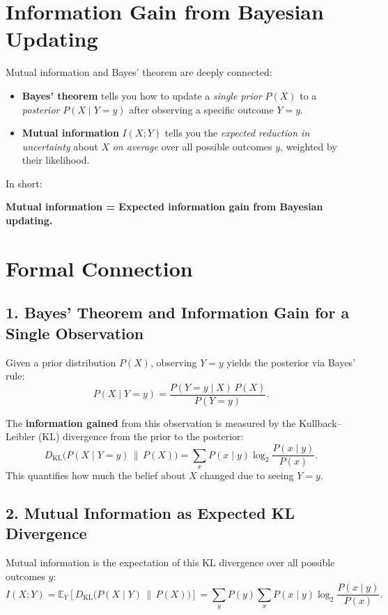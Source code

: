 \documentclass[11pt]{article}
\begin{document}
\section*{Information Gain from Bayesian Updating}

Mutual information and Bayes' theorem are deeply connected:
\begin{itemize}
\item \textbf{Bayes' theorem} tells you how to update a \emph{single prior} \(P(X)\) to a \emph{posterior} \(P(X \mid Y = y)\) after observing a specific outcome \(Y = y\).
    \item \textbf{Mutual information} \(I(X;Y)\) tells you the \emph{expected reduction in uncertainty} about \(X\) \emph{on average} over all possible outcomes \(y\), weighted by their likelihood.
\end{itemize}


In short:
\begin{center}
    \textbf{Mutual information = Expected information gain from Bayesian updating.}
\end{center}

\section*{Formal Connection}

\subsection*{1. Bayes' Theorem and Information Gain for a Single Observation}

Given a prior distribution \(P(X)\), observing \(Y = y\) yields the posterior via Bayes' rule:
\[
P(X \mid Y = y) = \frac{P(Y = y \mid X)\, P(X)}{P(Y = y)}.
\]

The \textbf{information gained} from this observation is measured by the Kullback–Leibler (KL) divergence from the prior to the posterior:
\[
D_{\mathrm{KL}}\big(P(X \mid Y = y) \,\|\, P(X)\big) 
= \sum_{x} P(x \mid y) \log_2 \frac{P(x \mid y)}{P(x)}.
\]
This quantifies how much the belief about \(X\) changed due to seeing \(Y = y\).

\subsection*{2. Mutual Information as Expected KL Divergence}

Mutual information is the expectation of this KL divergence over all possible outcomes \(y\):
\[
\boxed{
I(X;Y) = \mathbb{E}_{Y}\!\left[ D_{\mathrm{KL}}\big(P(X \mid Y) \,\|\, P(X)\big) \right]
= \sum_{y} P(y) \sum_{x} P(x \mid y) \log_2 \frac{P(x \mid y)}{P(x)}.
}
\]
\end{document}
